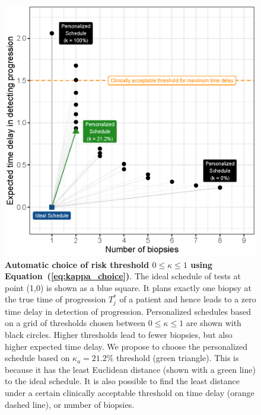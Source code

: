 \begin{figure}
\centerline{\includegraphics{images/kappa_choice_102.eps}}
\caption{\textbf{Automatic choice of risk threshold $0 \leq \kappa \leq 1$ using Equation~(\ref{eq:kappa_choice})}. The ideal schedule of tests at point (1,0) is shown as a blue square. It plans exactly one biopsy at the true time of progression $T^*_j$ of a patient and hence leads to a zero time delay in detection of progression. Personalized schedules based on a grid of thresholds chosen between $0 \leq \kappa \leq 1$ are shown with black circles. Higher thresholds lead to fewer biopsies, but also higher expected time delay. We propose to choose the personalized schedule based on $\kappa_a=21.2\%$ threshold (green triangle). This is because it has the least Euclidean distance (shown with a green line) to the ideal schedule. It is also possible to find the least distance under a certain clinically acceptable threshold on time delay (orange dashed line), or number of biopsies.}
\label{fig:kappa_choice}
\end{figure}

